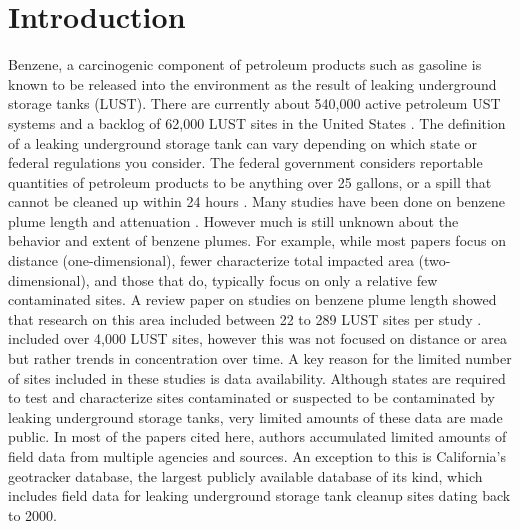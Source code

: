 \documentclass[draft,linenumbers]{agujournal2018}
\begin{document}
\section{Introduction}

Benzene, a carcinogenic component of petroleum products such as gasoline
is known to be released into the environment as the result of leaking
underground storage tanks (LUST). There are currently about 540,000
active petroleum UST systems and a backlog of 62,000 LUST sites in the
United States \citep{ustperformance} . The definition of a leaking
underground storage tank can vary depending on which state or federal
regulations you consider. The federal government considers reportable
quantities of petroleum products to be anything over 25 gallons, or a
spill that cannot be cleaned up within 24 hours \citep{coderegs}. Many
studies have been done on benzene plume length and attenuation
\citep[e.g.,][]{connor2015, kamath2012, shih2004evaluation}. However
much is still unknown about the behavior and extent of benzene plumes.
For example, while most papers focus on distance (one-dimensional),
fewer characterize total impacted area (two-dimensional), and those that
do, typically focus on only a relative few contaminated sites. A review
paper on studies on benzene plume length showed that research on this
area included between 22 to 289 LUST sites per study \citep{connor2015}.
\citet{mchugh2014progress} included over 4,000 LUST sites, however this
was not focused on distance or area but rather trends in concentration
over time. A key reason for the limited number of sites included in
these studies is data availability. Although states are required to test
and characterize sites contaminated or suspected to be contaminated by
leaking underground storage tanks, very limited amounts of these data
are made public. In most of the papers cited here, authors accumulated
limited amounts of field data from multiple agencies and sources. An
exception to this is California's geotracker database, the largest
publicly available database of its kind, which includes field data for
leaking underground storage tank cleanup sites dating back to 2000.
\end{document}
